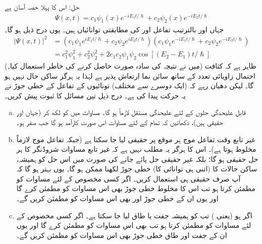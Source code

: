 حل:\quad
اس کا پہلا حصہ آسان ہے
\begin{align*}
\Psi (x,t) = c_{1} \psi_{1}(x)e^{-iE_{1}t/\hslash} + c_{2} \psi_{2}(x)e^{-iE_{2}t/\hslash}
\end{align*}
جہاں  اور  بالترتیب تفاعل  اور  کی مطابقتی توانائیاں ہیں۔ یوں  درج ذیل ہو گا۔ 
\begin{align*}
\left| \Psi (x,t) \right|^{2} &= \left( c_{1} \psi_{1} e^{iE_{1}t/\hslash} + c_{2} \psi_{2} e^{iE_{2}t/\hslash} \right) \left( c_{1} \psi_{1} e^{-iE_{1}t/\hslash} + c_{2} \psi_{2} e^{-iE_{2}t/\hslash} \right) \\
&= c_{1}^{2} \psi_{1}^{2} + c_{2}^{2} \psi_{2}^{2} + 2c_{1}c_{2}\psi_{1}\psi_{2} \cos [ ( E_{2} - E_{1})t/\hslash]
\end{align*}
(میں نے نتیجہ کی سادہ صورت حاصل کرنے کی خاطر   استعمال کیا۔) ظاہر ہے کہ کثافت احتمال زاویائی
 تعدد  کے ساتھ سائن نما ارتعاش پذیر ہے لہٰذا یہ ہرگز ساکن حال نہیں ہو گا۔ لیکن دھیان رہے کہ (ایک دوسرے سے مختلف) تونائیوں کے تفاعل کے خطی جوڑ نے یہ حرکت پیدا کی ہے۔ 
درج ذیل تین مسائل کا ثبوت پیش کریں۔
\begin{enumerate}[a.]
\item
قابل علیحدگی حلوں کے لئے علیحدگی مستقل  لازماً  ہو گا۔  مساوات  میں  کو  لکھ کر (جہاں  اور  حقیقی ہیں)، دکھائیں کہ تمام  کے لئے مساوات  اس صورت کارآمد ہو گا جب  صفر ہو۔ 
\item
غیر تابع وقت تفاعل موج  ہر موقع پر حقیقی لیا جا سکتا ہے (جبکہ تفاعل موج  لازماً مخلوط ہوتا ہے)۔ اس کا ہرگز یہ مطلب نہیں ہے کہ غیر تابع مساوات شروڈنگر کا ہر حل حقیقی ہو گا؛ بلکہ غیر حقیقی حل پائے جانے کی صورت میں اس حل کو ہمیشہ، ساکن حالات کا (اتنی ہی توانائی کا) خطی جوڑ لکھنا ممکن ہو گا۔ یوں بہتر ہو گا کہ آپ صرف حقیقی  ہی استعمال کریں۔  اگر کسی مخصوص  کے لئے  مساوات  کو مطمئن کرتا ہو تب اس کا مخلوط خطی جوڑ بھی اس مساوات کو مطمئن کرے گا اور یوں ان کے خطی جوڑ  اور  بھی اس مساوات کو مطمئن کریں گے۔
\item
اگر   ہو (یعنی ) تب  کو ہمیشہ جفت یا طاق لیا جا سکتا ہے۔  اگر کسی مخصوص  کے لئے  مساوات  کو مطمئن کرتا ہو تب  بھی اس مساوات کو مطمئن کرے گا اور یوں ان کے جفت اور طاق خطی جوڑ  بھی اس مساوات کو مطمئن کریں گے۔ 
\end{enumerate}
